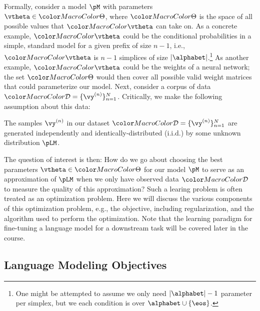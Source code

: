 Formally, consider a model $\pM$ with parameters $\vtheta\in \paramspace$, where $\paramspace$ is the space of all possible values that $\modelparams$ can take on. 
As a concrete example, $\modelparams$ could be the conditional probabilities in a simple, standard \ngram model for a given prefix of size $n-1$, i.e., $\modelparams$ is $n-1$ simplices of size $|\alphabet|$.\footnote{One might be attempted to assume we only need $|\alphabet|-1$ parameter per simplex, but we each condition is over $\alphabet \cup \{\eos\}$.}
As another example, $\modelparams$ could be the weights of a neural network; the set $\paramspace$ would then cover all possible valid weight matrices that could parameterize our model. Next, consider a corpus of data $\corpus = \{ \vy^{(n)}\}_{n=1}^{N}$. Critically, we make the following assumption about this data:
\begin{assumption}
The samples $\vy^{(n)}$ in our dataset $\corpus = \{ \vy^{(n)}\}_{n=1}^{N}$ are generated independently and identically-distributed (i.i.d.) by some unknown distribution $\pLM$.
\end{assumption}

\noindent The question of interest is then: How do we go about choosing the best parameters $\vtheta\in\paramspace$ for our model $\pM$ to serve as an approximation of $\pLM$ when we only have observed data $\corpus$ to measure the quality of this approximation? 
Such a learing problem is often treated as an optimization problem. 
Here we will discuss the various components of this optimization problem, e.g., the objective, including regularization, and the algorithm used to perform the optimization.
Note that the learning paradigm for fine-tuning a language model for a downstream task will be covered later in the course. 


\subsection{Language Modeling Objectives}


